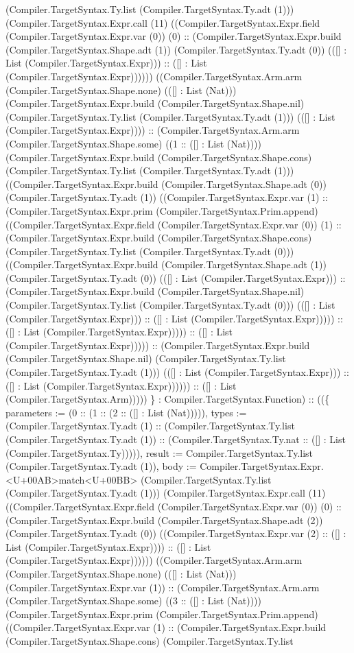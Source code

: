 \documentclass[11pt]{article}
\begin{document}
(Compiler.TargetSyntax.Ty.list (Compiler.TargetSyntax.Ty.adt (1))) (Compiler.TargetSyntax.Expr.call (11) ((Compiler.TargetSyntax.Expr.field (Compiler.TargetSyntax.Expr.var (0)) (0) :: (Compiler.TargetSyntax.Expr.build (Compiler.TargetSyntax.Shape.adt (1)) (Compiler.TargetSyntax.Ty.adt (0)) (([] : List (Compiler.TargetSyntax.Expr))) :: ([] : List (Compiler.TargetSyntax.Expr)))))) ((Compiler.TargetSyntax.Arm.arm (Compiler.TargetSyntax.Shape.none) (([] : List (Nat))) (Compiler.TargetSyntax.Expr.build (Compiler.TargetSyntax.Shape.nil) (Compiler.TargetSyntax.Ty.list (Compiler.TargetSyntax.Ty.adt (1))) (([] : List (Compiler.TargetSyntax.Expr)))) :: (Compiler.TargetSyntax.Arm.arm (Compiler.TargetSyntax.Shape.some) ((1 :: ([] : List (Nat)))) (Compiler.TargetSyntax.Expr.build (Compiler.TargetSyntax.Shape.cons) (Compiler.TargetSyntax.Ty.list (Compiler.TargetSyntax.Ty.adt (1))) ((Compiler.TargetSyntax.Expr.build (Compiler.TargetSyntax.Shape.adt (0)) (Compiler.TargetSyntax.Ty.adt (1)) ((Compiler.TargetSyntax.Expr.var (1) :: (Compiler.TargetSyntax.Expr.prim (Compiler.TargetSyntax.Prim.append) ((Compiler.TargetSyntax.Expr.field (Compiler.TargetSyntax.Expr.var (0)) (1) :: (Compiler.TargetSyntax.Expr.build (Compiler.TargetSyntax.Shape.cons) (Compiler.TargetSyntax.Ty.list (Compiler.TargetSyntax.Ty.adt (0))) ((Compiler.TargetSyntax.Expr.build (Compiler.TargetSyntax.Shape.adt (1)) (Compiler.TargetSyntax.Ty.adt (0)) (([] : List (Compiler.TargetSyntax.Expr))) :: (Compiler.TargetSyntax.Expr.build (Compiler.TargetSyntax.Shape.nil) (Compiler.TargetSyntax.Ty.list (Compiler.TargetSyntax.Ty.adt (0))) (([] : List (Compiler.TargetSyntax.Expr))) :: ([] : List (Compiler.TargetSyntax.Expr))))) :: ([] : List (Compiler.TargetSyntax.Expr))))) :: ([] : List (Compiler.TargetSyntax.Expr))))) :: (Compiler.TargetSyntax.Expr.build (Compiler.TargetSyntax.Shape.nil) (Compiler.TargetSyntax.Ty.list (Compiler.TargetSyntax.Ty.adt (1))) (([] : List (Compiler.TargetSyntax.Expr))) :: ([] : List (Compiler.TargetSyntax.Expr)))))) :: ([] : List (Compiler.TargetSyntax.Arm))))) \} : Compiler.TargetSyntax.Function) :: ((\{ parameters := (0 :: (1 :: (2 :: ([] : List (Nat))))), types := (Compiler.TargetSyntax.Ty.adt (1) :: (Compiler.TargetSyntax.Ty.list (Compiler.TargetSyntax.Ty.adt (1)) :: (Compiler.TargetSyntax.Ty.nat :: ([] : List (Compiler.TargetSyntax.Ty))))), result := Compiler.TargetSyntax.Ty.list (Compiler.TargetSyntax.Ty.adt (1)), body := Compiler.TargetSyntax.Expr.<U+00AB>match<U+00BB> (Compiler.TargetSyntax.Ty.list (Compiler.TargetSyntax.Ty.adt (1))) (Compiler.TargetSyntax.Expr.call (11) ((Compiler.TargetSyntax.Expr.field (Compiler.TargetSyntax.Expr.var (0)) (0) :: (Compiler.TargetSyntax.Expr.build (Compiler.TargetSyntax.Shape.adt (2)) (Compiler.TargetSyntax.Ty.adt (0)) ((Compiler.TargetSyntax.Expr.var (2) :: ([] : List (Compiler.TargetSyntax.Expr)))) :: ([] : List (Compiler.TargetSyntax.Expr)))))) ((Compiler.TargetSyntax.Arm.arm (Compiler.TargetSyntax.Shape.none) (([] : List (Nat))) (Compiler.TargetSyntax.Expr.var (1)) :: (Compiler.TargetSyntax.Arm.arm (Compiler.TargetSyntax.Shape.some) ((3 :: ([] : List (Nat)))) (Compiler.TargetSyntax.Expr.prim (Compiler.TargetSyntax.Prim.append) ((Compiler.TargetSyntax.Expr.var (1) :: (Compiler.TargetSyntax.Expr.build (Compiler.TargetSyntax.Shape.cons) (Compiler.TargetSyntax.Ty.list 
\end{document}
